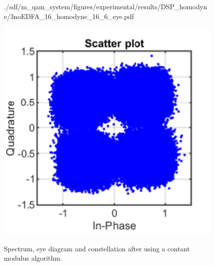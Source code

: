 \begin{figure}[H]
\begin{minipage}{0.30\textwidth}
			{./sdf/m_qam_system/figures/experimental/results/DSP_homodyne/3noEDFA_16_homodyne_16_6_eye.pdf}
			\label{fig:16GBdSpecMF}
		\end{minipage}
		\begin{minipage}{0.30\textwidth}
			\centering
			\includegraphics[width=1\textwidth]
			{./sdf/m_qam_system/figures/experimental/results/DSP_homodyne/3noEDFA_16_homodyne_16_6_const.pdf}\\
			\label{fig:16GBdSpecBefFec}
		\end{minipage}
		\caption{Spectrum, eye diagram and constellation after using a contant modulus
		algorithm.}
		\label{fig:16GBMFHm}
	\end{figure}


